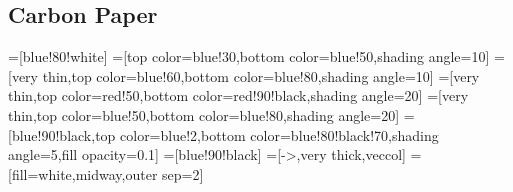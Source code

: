 \documentclass[article, 12pt]{article}
\def\N{80} %
\begin{document}
    \subsection{Carbon Paper}
\usetikzlibrary{angles,quotes} %
\usetikzlibrary{calc}
\usetikzlibrary{decorations.markings}
=[blue!80!white]
=[top color=blue!30,bottom color=blue!50,shading angle=10]
=[very thin,top color=blue!60,bottom color=blue!80,shading angle=10]
=[very thin,top color=red!50,bottom color=red!90!black,shading angle=20]
=[very thin,top color=blue!50,bottom color=blue!80,shading angle=20]
=[blue!90!black,top color=blue!2,bottom color=blue!80!black!70,shading angle=5,fill opacity=0.1]
=[blue!90!black]
=[->,very thick,veccol]
=[fill=white,midway,outer sep=2]
\def\L{8}
\def\W{0.25}
\def\N{14}
\end{document}
